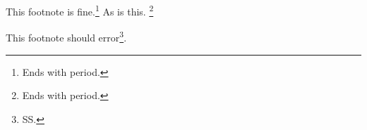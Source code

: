 \documentclass{article}
\begin{document}
This footnote is fine.\footnote{Ends with period.}
As is this.%
	\footnote{Ends with period.}

This footnote should error\footnote{SS.}.
\end{document}
